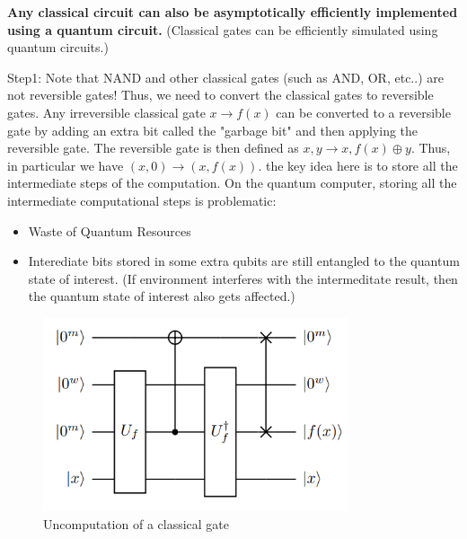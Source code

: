 \documentclass[12pt, oneside]{book}
\theoremstyle{definition}
\theoremstyle{definition}
\theoremstyle{remark}
\begin{document}
\textbf{Any classical circuit can also be asymptotically efficiently implemented using a quantum circuit.} (Classical gates can be efficiently
simulated using quantum circuits.)
 
Step1: Note that NAND and other classical gates (such as AND, OR, etc..) are not reversible gates! Thus, we need to convert the classical gates to reversible gates.
Any irreversible classical gate $x \rightarrow f(x)$ can be converted to a reversible gate by adding an extra bit called the "garbage bit" and then applying the reversible gate.
The reversible gate is then defined as $x,y \rightarrow x,f(x)\oplus y$.
Thus, in particular we have $(x,0) \rightarrow (x,f(x))$.
the key idea here is to store all the intermediate steps of the computation.
On the quantum computer, storing all the intermediate computational steps is problematic:
\begin{itemize}
    \item Waste of Quantum Resources
    \item Interediate bits stored in some extra qubits are still entangled to the quantum state of interest. (If environment interferes with the
    intermeditate result, then the quantum state of interest also gets affected.)
\end{itemize}
\begin{figure}[H]
    \centering
    \includegraphics[width=0.8\textwidth]{../images/uncomputation.png}
    \caption{Uncomputation of a classical gate}
    \label{fig:uncomp}
\end{figure}
\end{document}
